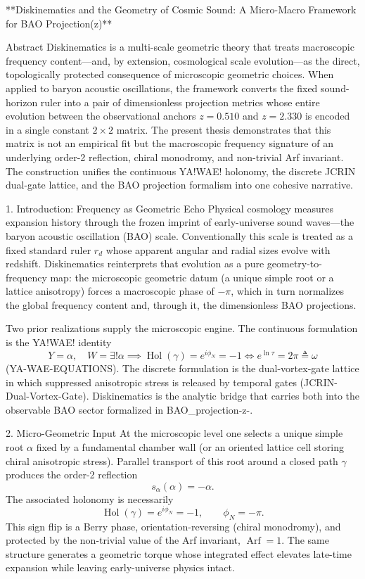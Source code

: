 **Diskinematics and the Geometry of Cosmic Sound:  
A Micro-Macro Framework for BAO Projection(z)**

Abstract
Diskinematics is a multi-scale geometric theory that treats macroscopic frequency content—and, by extension, cosmological scale evolution—as the direct, topologically protected consequence of microscopic geometric choices. When applied to baryon acoustic oscillations, the framework converts the fixed sound-horizon ruler into a pair of dimensionless projection metrics whose entire evolution between the observational anchors \(z=0.510\) and \(z=2.330\) is encoded in a single constant \(2\times2\) matrix. The present thesis demonstrates that this matrix is not an empirical fit but the macroscopic frequency signature of an underlying order-2 reflection, chiral monodromy, and non-trivial Arf invariant. The construction unifies the continuous YA!WAE! holonomy, the discrete JCRIN dual-gate lattice, and the BAO projection formalism into one cohesive narrative.

1. Introduction: Frequency as Geometric Echo
Physical cosmology measures expansion history through the frozen imprint of early-universe sound waves—the baryon acoustic oscillation (BAO) scale. Conventionally this scale is treated as a fixed standard ruler \(r_d\) whose apparent angular and radial sizes evolve with redshift. Diskinematics reinterprets that evolution as a pure geometry-to-frequency map: the microscopic geometric datum (a unique simple root or a lattice anisotropy) forces a macroscopic phase of \(-\pi\), which in turn normalizes the global frequency content and, through it, the dimensionless BAO projections.

Two prior realizations supply the microscopic engine. The continuous formulation is the YA!WAE! identity  
\[
Y=\alpha,\quad W=\exists!\alpha\implies\operatorname{Hol}(\gamma)=e^{i\phi_N}=-1\iff e^{\ln\tau}=2\pi\triangleq\omega
\]  
(YA-WAE-EQUATIONS). The discrete formulation is the dual-vortex-gate lattice in which suppressed anisotropic stress is released by temporal gates (JCRIN-Dual-Vortex-Gate). Diskinematics is the analytic bridge that carries both into the observable BAO sector formalized in BAO_projection-z-.

2. Micro-Geometric Input
At the microscopic level one selects a unique simple root \(\alpha\) fixed by a fundamental chamber wall (or an oriented lattice cell storing chiral anisotropic stress). Parallel transport of this root around a closed path \(\gamma\) produces the order-2 reflection  
\[
s_\alpha(\alpha)=-\alpha.
\]  
The associated holonomy is necessarily  
\[
\operatorname{Hol}(\gamma)=e^{i\phi_N}=-1,\qquad\phi_N=-\pi.
\]  
This sign flip is a Berry phase, orientation-reversing (chiral monodromy), and protected by the non-trivial value of the Arf invariant, \(\operatorname{Arf}=1\). The same structure generates a geometric torque whose integrated effect elevates late-time expansion while leaving early-universe physics intact.

